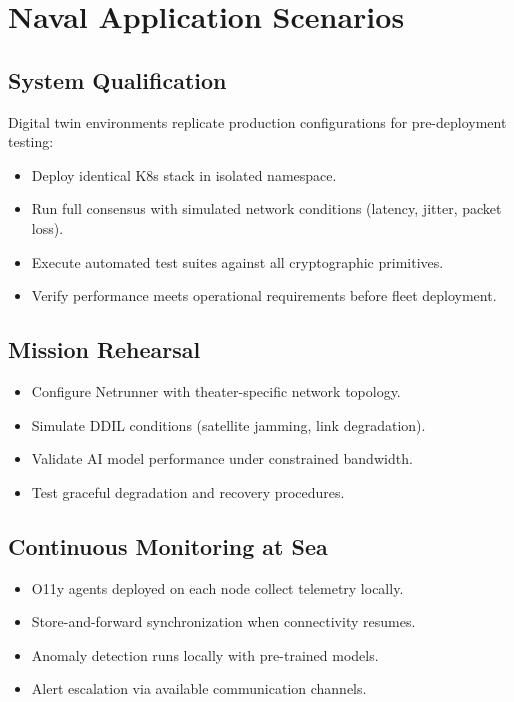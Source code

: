\documentclass[11pt,letterpaper]{article}
\begin{document}
\section{Naval Application Scenarios}

\subsection{System Qualification}

Digital twin environments replicate production configurations for pre-deployment testing:
\begin{itemize}
\item Deploy identical K8s stack in isolated namespace.
\item Run full consensus with simulated network conditions (latency, jitter, packet loss).
\item Execute automated test suites against all cryptographic primitives.
\item Verify performance meets operational requirements before fleet deployment.
\end{itemize}

\subsection{Mission Rehearsal}

\begin{itemize}
\item Configure Netrunner with theater-specific network topology.
\item Simulate DDIL conditions (satellite jamming, link degradation).
\item Validate AI model performance under constrained bandwidth.
\item Test graceful degradation and recovery procedures.
\end{itemize}

\subsection{Continuous Monitoring at Sea}

\begin{itemize}
\item O11y agents deployed on each node collect telemetry locally.
\item Store-and-forward synchronization when connectivity resumes.
\item Anomaly detection runs locally with pre-trained models.
\item Alert escalation via available communication channels.
\end{itemize}
\end{document}
